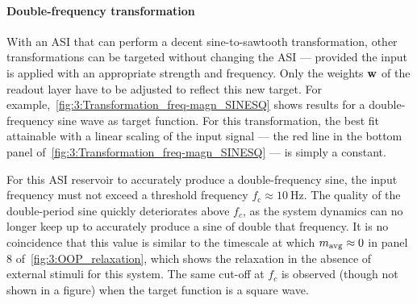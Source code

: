 \paragraph{Double-frequency transformation}
With an ASI that can perform a decent sine-to-sawtooth transformation, other transformations can be targeted without changing the ASI --- provided the input is applied with an appropriate strength and frequency.
Only the weights $\boldsymbol{\mathbf{w}}$ of the readout layer have to be adjusted to reflect this new target.
For example,~\cref{fig:3:Transformation_freq-magn_SINESQ} shows results for a double-frequency sine wave as target function.
For this transformation, the best fit attainable with a linear scaling of the input signal --- the red line in the bottom panel of~\cref{fig:3:Transformation_freq-magn_SINESQ} --- is simply a constant.


For this ASI reservoir to accurately produce a double-frequency sine, the input frequency must not exceed a threshold frequency $f_\mathrm{c} \approx \SI{10}{\hertz}$.
The quality of the double-period sine quickly deteriorates above $f_c$, as the system dynamics can no longer keep up to accurately produce a sine of double that frequency.
It is no coincidence that this value is similar to the timescale at which $m_\mathrm{avg} \approx 0$ in panel 8 of~\cref{fig:3:OOP_relaxation}, which shows the relaxation in the absence of external stimuli for this system.
The same cut-off at $f_c$ is observed (though not shown in a figure) when the target function is a square wave.

